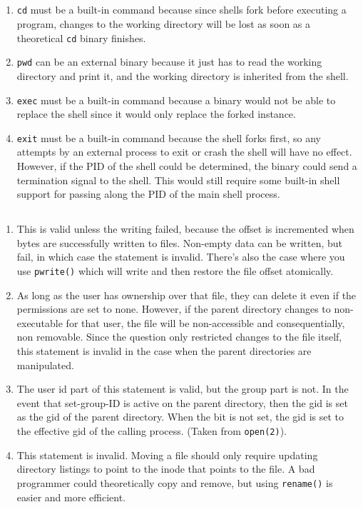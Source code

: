 \documentclass[a4paper,11pt]{article}
\def\code#1{\texttt{#1}}
\begin{document}
\subsection{}
\begin{enumerate}
  \item \code{cd} must be a built-in command because since shells fork before executing
    a program, changes to the working directory will be lost as soon as a theoretical
    \code{cd} binary finishes.
  \item \code{pwd} can be an external binary because it just has to read the working
    directory and print it, and the working directory is inherited from the shell.
  \item \code{exec} must be a built-in command because a binary would not be able to
    replace the shell since it would only replace the forked instance.
  \item \code{exit} must be a built-in command because the shell forks first, so any attempts
    by an external process to exit or crash the shell will have no effect.
    However, if the PID of the shell could be determined, the binary could send a termination
    signal to the shell.
    This would still require some built-in shell support for passing along the PID of the main
    shell process.
\end{enumerate}

\subsection{}
\begin{enumerate}
  \item This is valid unless the writing failed, because the offset is incremented
    when bytes are successfully written to files.
    Non-empty data can be written, but fail, in which case the statement is invalid.
    There's also the case where you use \code{pwrite()} which will write and then restore
    the file offset atomically.
  \item As long as the user has ownership over that file, they can delete it even
    if the permissions are set to none.
    However, if the parent directory changes to non-executable for that user,
    the file will be non-accessible and consequentially, non removable.
    Since the question only restricted changes to the file itself, this statement
    is invalid in the case when the parent directories are manipulated.
  \item The user id part of this statement is valid, but the group part is not.
    In the event that set-group-ID is active on the parent directory, then the gid
    is set as the gid of the parent directory.
    When the bit is not set, the gid is set to the effective gid of the calling process.
    (Taken from \code{open(2)}).
  \item This statement is invalid.
    Moving a file should only require updating directory listings to point to the inode
    that points to the file.
    A bad programmer could theoretically copy and remove, but using \code{rename()} is
    easier and more efficient.
\end{enumerate}
\end{document}
